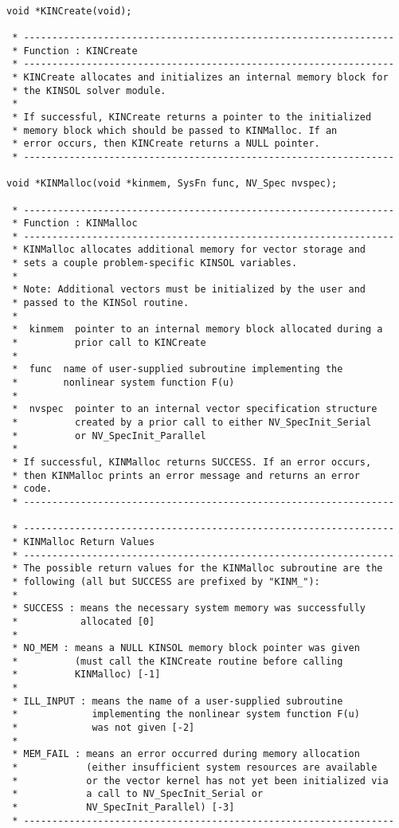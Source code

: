 \documentclass[11pt]{article}
\begin{document}
\small
\begin{verbatim}

void *KINCreate(void);

 * -----------------------------------------------------------------
 * Function : KINCreate
 * -----------------------------------------------------------------
 * KINCreate allocates and initializes an internal memory block for
 * the KINSOL solver module.
 *
 * If successful, KINCreate returns a pointer to the initialized
 * memory block which should be passed to KINMalloc. If an
 * error occurs, then KINCreate returns a NULL pointer.
 * -----------------------------------------------------------------

void *KINMalloc(void *kinmem, SysFn func, NV_Spec nvspec);

 * -----------------------------------------------------------------
 * Function : KINMalloc
 * -----------------------------------------------------------------
 * KINMalloc allocates additional memory for vector storage and
 * sets a couple problem-specific KINSOL variables.
 *
 * Note: Additional vectors must be initialized by the user and
 * passed to the KINSol routine.
 *
 *  kinmem  pointer to an internal memory block allocated during a
 *          prior call to KINCreate
 *
 *  func  name of user-supplied subroutine implementing the
 *        nonlinear system function F(u)
 *
 *  nvspec  pointer to an internal vector specification structure
 *          created by a prior call to either NV_SpecInit_Serial
 *          or NV_SpecInit_Parallel
 *
 * If successful, KINMalloc returns SUCCESS. If an error occurs,
 * then KINMalloc prints an error message and returns an error
 * code.
 * -----------------------------------------------------------------

 * -----------------------------------------------------------------
 * KINMalloc Return Values
 * -----------------------------------------------------------------
 * The possible return values for the KINMalloc subroutine are the
 * following (all but SUCCESS are prefixed by "KINM_"):
 *
 * SUCCESS : means the necessary system memory was successfully
 *           allocated [0]
 *
 * NO_MEM : means a NULL KINSOL memory block pointer was given
 *          (must call the KINCreate routine before calling
 *          KINMalloc) [-1]
 *
 * ILL_INPUT : means the name of a user-supplied subroutine
 *             implementing the nonlinear system function F(u)
 *             was not given [-2]
 *
 * MEM_FAIL : means an error occurred during memory allocation
 *            (either insufficient system resources are available
 *            or the vector kernel has not yet been initialized via
 *            a call to NV_SpecInit_Serial or
 *            NV_SpecInit_Parallel) [-3]
 * -----------------------------------------------------------------

\end{verbatim}
\normalsize
\end{document}
